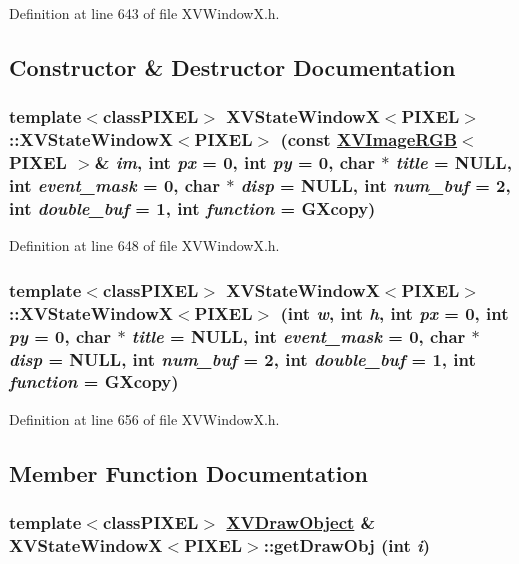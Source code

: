 Definition at line 643 of file XVWindow\-X.h.

\subsection{Constructor \& Destructor Documentation}
\label{XVStateWindowX_a0}
\hypertarget{class_XVStateWindowX_a0}{
\subsubsection[XVStateWindowX]{\setlength{\rightskip}{0pt plus 5cm}template$<$classPIXEL$>$ XVState\-Window\-X$<$PIXEL$>$::XVState\-Window\-X$<$PIXEL$>$ (const \hyperlink{class_XVImageRGB}{XVImage\-RGB}$<$ PIXEL $>$\& {\em im}, int {\em px} = 0, int {\em py} = 0, char $\ast$ {\em title} = NULL, int {\em event\_\-mask} = 0, char $\ast$ {\em disp} = NULL, int {\em num\_\-buf} = 2, int {\em double\_\-buf} = 1, int {\em function} = GXcopy)}}




Definition at line 648 of file XVWindow\-X.h.\label{XVStateWindowX_a1}
\hypertarget{class_XVStateWindowX_a1}{
\subsubsection[XVStateWindowX]{\setlength{\rightskip}{0pt plus 5cm}template$<$classPIXEL$>$ XVState\-Window\-X$<$PIXEL$>$::XVState\-Window\-X$<$PIXEL$>$ (int {\em w}, int {\em h}, int {\em px} = 0, int {\em py} = 0, char $\ast$ {\em title} = NULL, int {\em event\_\-mask} = 0, char $\ast$ {\em disp} = NULL, int {\em num\_\-buf} = 2, int {\em double\_\-buf} = 1, int {\em function} = GXcopy)}}




Definition at line 656 of file XVWindow\-X.h.

\subsection{Member Function Documentation}
\label{XVStateWindowX_a13}
\hypertarget{class_XVStateWindowX_a13}{
\subsubsection[getDrawObj]{\setlength{\rightskip}{0pt plus 5cm}template$<$classPIXEL$>$ \hyperlink{class_XVDrawObject}{XVDraw\-Object} \& XVState\-Window\-X$<$PIXEL$>$::get\-Draw\-Obj (int {\em i})}}




